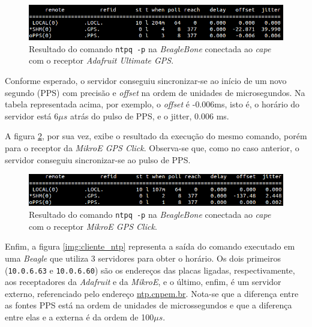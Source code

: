 \begin{figure}[h]
    
    \centering
    \includegraphics[scale=0.6]{image/adafruit_GPS}
    \caption {Resultado do comando \texttt{ntpq -p} na
    \textit{BeagleBone} conectada ao \textit{cape} com o receptor \textit{Adafruit Ultimate GPS}.}
    \label{img:adafruit} 
\end{figure} 

\vspace{12pt}

Conforme esperado, o servidor conseguiu sincronizar-se ao início de um novo
segundo (PPS) com precisão e \textit{offset} na ordem de unidades de
microsegundos. Na tabela representada acima, por exemplo, o \textit{offset} é
-0.006ms, isto é, o horário do servidor está 6\(\mu s\) atrás do pulso de
PPS, e o jitter, 0.006 ms.

\vspace{12pt}

A figura \ref{img:mikroe}, por sua vez, exibe o resultado da execução do mesmo
comando, porém para o receptor da \textit{MikroE GPS Click}. Observa-se que,
como no caso anterior, o servidor conseguiu sincronizar-se ao pulso de PPS.  

\begin{figure}[h]
    \centering
    \includegraphics[scale=0.6]{image/mikroe}
    \caption {Resultado do comando \texttt{ntpq -p} na
    \textit{BeagleBone} conectada ao \textit{cape} com o receptor \textit{MikroE
    GPS Click}.}  
    \label{img:mikroe} 
\end{figure} 

Enfim, a figura \ref{img:cliente_ntp} representa a saída do comando executado em
uma \textit{Beagle} que utiliza 3 servidores para obter o horário. Os dois
primeiros (\texttt{10.0.6.63} e \texttt{10.0.6.60}) são os
endereços das placas ligadas, respectivamente, aos receptadores da
\textit{Adafruit} e da \textit{MikroE}, e o último, enfim, é um servidor
externo, referenciado pelo endereço \url{ntp.cnpem.br}.  Nota-se que a diferença
entre as fontes PPS está na ordem de unidades de microssegundos e que a
diferença entre elas e a externa é da ordem de 100\(\mu s\).

